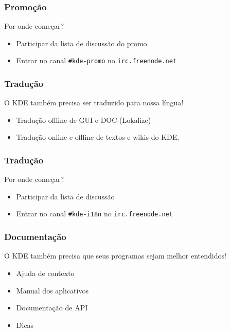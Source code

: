 \documentclass[hyperref={pdfpagelabels=false}]{beamer}
\begin{document}
\begin{frame}
   \frametitle{Promoção}
   Por onde começar?
   \begin{itemize}
      \item Participar da lista de discussão do promo
      \item Entrar no canal {\tt{\#kde-promo}} no {\tt{irc.freenode.net}}
   \end{itemize}
\end{frame}
\begin{frame}
   \frametitle{Tradução}
   \begin{center}
      \begin{block}{}
         \begin{center}
            O KDE também precisa ser traduzido para nossa língua!
         \end{center}
      \end{block}
   \end{center}
   \begin{itemize}
      \item Tradução offline de GUI e DOC (Lokalize)
      \item Tradução online e offline de textos e wikis do KDE.
   \end{itemize}
\end{frame}
\begin{frame}
   \frametitle{Tradução}
   Por onde começar?
   \begin{itemize}
      \item Participar da lista de discussão
      \item Entrar no canal {\tt{\#kde-i18n}} no {\tt{irc.freenode.net}}
   \end{itemize}
\end{frame}
\begin{frame}
   \frametitle{Documentação}
   \begin{center}
      \begin{block}{}
         \begin{center}
            O KDE também precisa que seus programas sejam melhor entendidos!
         \end{center}
      \end{block}
   \end{center}
   \begin{itemize}
      \item Ajuda de contexto
      \item Manual dos aplicativos
      \item Documentação de API
      \item Dicas 
   \end{itemize}
\end{frame}
\end{document}
